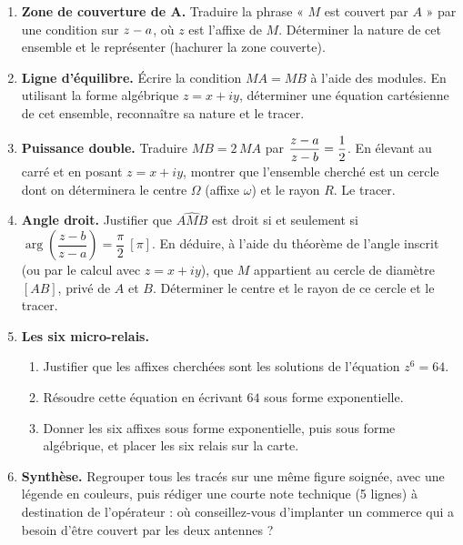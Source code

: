 \documentclass[11pt]{article}
\providecommand{\abs}{}\let\abs\relax\DeclarePairedDelimiter{\abs}{\lvert}{\rvert}
\newcounter{popsec}
\newcounter{popsub}
\newcommand{\courssub}[1]{%
  \stepcounter{popsub}%
  \par\vspace{9pt}\noindent{\popxbold\fontsize{11.5}{13}\selectfont\color{popink}{\color{poporange}\thepopsec.\thepopsub}\hspace{6pt}#1}\par\nopagebreak\vspace{4pt}
}
\begin{document}
\begin{enumerate}
\item \textbf{Zone de couverture de A.} Traduire la phrase « $M$ est couvert par $A$ » par une condition sur $\abs{z-a}$, où $z$ est l'affixe de $M$. Déterminer la nature de cet ensemble et le représenter (hachurer la zone couverte).
\item \textbf{Ligne d'équilibre.} Écrire la condition $MA = MB$ à l'aide des modules. En utilisant la forme algébrique $z=x+iy$, déterminer une équation cartésienne de cet ensemble, reconnaître sa nature et le tracer.
\item \textbf{Puissance double.} Traduire $MB = 2\,MA$ par $\abs{\dfrac{z-a}{z-b}} = \dfrac{1}{2}$. En élevant au carré et en posant $z=x+iy$, montrer que l'ensemble cherché est un cercle dont on déterminera le centre $\Omega$ (affixe $\omega$) et le rayon $R$. Le tracer.
\item \textbf{Angle droit.} Justifier que $\widehat{AMB}$ est droit si et seulement si $\arg\!\left(\dfrac{z-b}{z-a}\right) = \dfrac{\pi}{2}\ [\pi]$. En déduire, à l'aide du théorème de l'angle inscrit (ou par le calcul avec $z=x+iy$), que $M$ appartient au cercle de diamètre $[AB]$, privé de $A$ et $B$. Déterminer le centre et le rayon de ce cercle et le tracer.
\item \textbf{Les six micro-relais.}
\begin{enumerate}
\item Justifier que les affixes cherchées sont les solutions de l'équation $z^6 = 64$.
\item Résoudre cette équation en écrivant $64$ sous forme exponentielle.
\item Donner les six affixes sous forme exponentielle, puis sous forme algébrique, et placer les six relais sur la carte.
\end{enumerate}
\item \textbf{Synthèse.} Regrouper tous les tracés sur une même figure soignée, avec une légende en couleurs, puis rédiger une courte note technique (5 lignes) à destination de l'opérateur : où conseillez-vous d'implanter un commerce qui a besoin d'être couvert par les deux antennes ?
\end{enumerate}

\courssub{Ressources à mobiliser}
\end{document}
